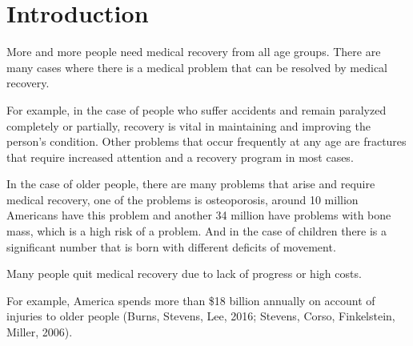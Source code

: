 \chapter{Introduction}

More and more people need medical recovery from all age groups.
There are many cases where there is a medical problem that can be resolved by medical recovery.


For example, in the case of people who suffer accidents and remain paralyzed completely or partially, 
recovery is vital in maintaining and improving the person's condition.
Other problems that occur frequently at any age are fractures that require increased attention 
and a recovery program in most cases.


In the case of older people, there are many problems that arise and
require medical recovery, one of the problems is osteoporosis,
around 10 million Americans have this problem and another 34 million have problems with bone mass, 
which is a high risk of a problem.\cite{keen2003burden}
And in the case of children there is a significant number that is born with different deficits of movement.

Many people quit medical recovery due to lack of progress or high costs.

For example, America spends more than \$18 billion annually on account of injuries to older people
(Burns, Stevens, Lee, 2016; Stevens, Corso, Finkelstein,  Miller, 2006).

